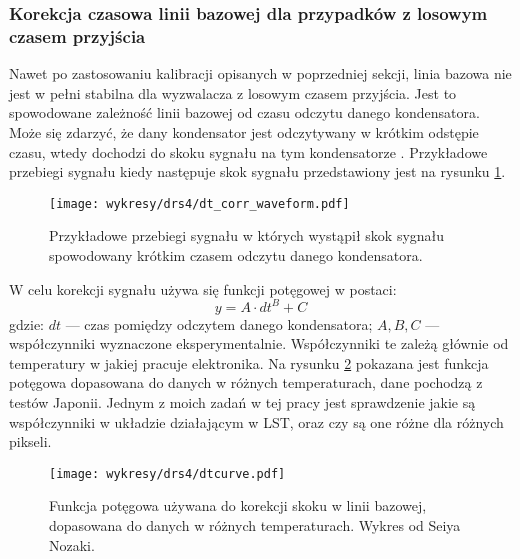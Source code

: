 \documentclass[a4paper,11pt,twoside]{article}
\begin{document}
\subsubsection{Korekcja czasowa linii bazowej dla przypadków z losowym czasem przyjścia}
Nawet po zastosowaniu kalibracji opisanych w poprzedniej sekcji, linia bazowa nie jest w pełni stabilna dla wyzwalacza z losowym czasem przyjścia. Jest to spowodowane zależność linii bazowej od czasu odczytu danego kondensatora. Może się zdarzyć, że dany kondensator jest odczytywany w krótkim odstępie czasu, wtedy dochodzi do skoku sygnału na tym kondensatorze \cite{drs4_magic}. Przykładowe przebiegi sygnału kiedy następuje skok sygnału przedstawiony jest na rysunku \ref{fig:dt_corr}. 
\begin{figure}[H] 
\centering
\texttt{[image: wykresy/drs4/dt\_corr\_waveform.pdf]}
\caption{Przykładowe przebiegi sygnału w których wystąpił skok sygnału spowodowany krótkim czasem odczytu danego kondensatora.}
\label{fig:dt_corr}
\end{figure}
W celu korekcji sygnału używa się funkcji potęgowej w postaci:
\begin{equation}
\label{eqn:power_law}
y = A \cdot dt^B + C
\end{equation}
gdzie: $dt$ --- czas pomiędzy odczytem danego kondensatora; $A, B, C$ --- współczynniki wyznaczone eksperymentalnie. 
Współczynniki te zależą głównie od temperatury w jakiej pracuje elektronika. Na rysunku \ref{fig:dt_corr_fit} pokazana jest funkcja potęgowa dopasowana do danych w różnych temperaturach, dane pochodzą z testów Japonii. Jednym z moich zadań w tej pracy jest sprawdzenie jakie są współczynniki w układzie działającym w LST, oraz czy są one różne dla różnych pikseli. 
\begin{figure}[H] 
\centering
\texttt{[image: wykresy/drs4/dtcurve.pdf]}
\caption{Funkcja potęgowa używana do korekcji skoku w linii bazowej, dopasowana do danych w różnych temperaturach. Wykres od Seiya Nozaki.}
\label{fig:dt_corr_fit}
\end{figure}
\newpage
\end{document}
